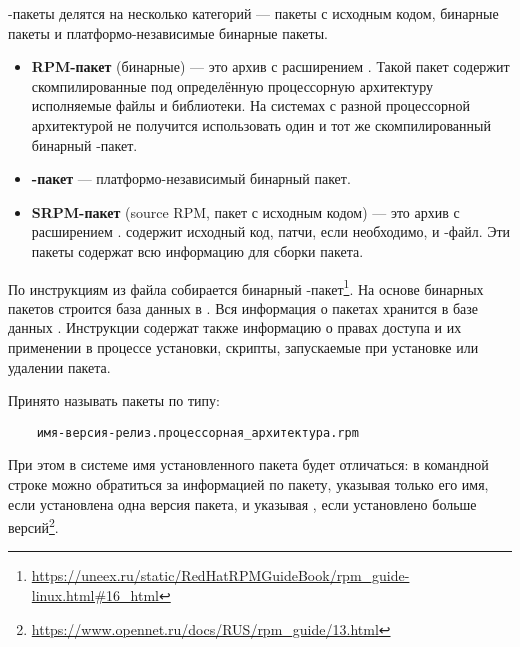-пакеты делятся на несколько категорий --- пакеты с исходным кодом, бинарные пакеты и платформо-независимые бинарные пакеты.
\begin{itemize}
	\item \textbf{RPM-пакет} (бинарные) --- это архив с расширением . Такой пакет содержит скомпилированные под определённую процессорную архитектуру исполняемые файлы и библиотеки. На системах с разной процессорной архитектурой не получится использовать один и тот же скомпилированный бинарный -пакет.
	
	\item \textbf{-пакет} --- платформо-независимый бинарный пакет.
	
	\item \textbf{SRPM-пакет} (source RPM, пакет с исходным кодом) --- это архив с расширением .  содержит исходный код, патчи, если необходимо, и -файл. Эти пакеты содержат всю информацию для сборки пакета.
\end{itemize}

По инструкциям из  файла собирается бинарный -пакет\footnote{\href{https://uneex.ru/static/RedHatRPMGuideBook/rpm_guide-linux.html\#16_html}{https://uneex.ru/static/RedHatRPMGuideBook/rpm\_guide-linux.html\#16\_html}}. На основе бинарных пакетов строится база данных в . Вся информация о пакетах хранится в базе данных . Инструкции содержат также информацию о правах доступа и их применении в процессе установки, скрипты, запускаемые при установке или удалении пакета.

Принято называть пакеты  по типу:

\begin{verbatim}
	имя-версия-релиз.процессорная_архитектура.rpm
\end{verbatim}

При этом в системе имя установленного пакета будет отличаться: в командной строке можно обратиться за информацией по пакету, указывая только его имя, если установлена одна версия пакета, и указывая , если установлено больше версий\footnote{\href{https://www.opennet.ru/docs/RUS/rpm_guide/13.html}{https://www.opennet.ru/docs/RUS/rpm\_guide/13.html}}.
